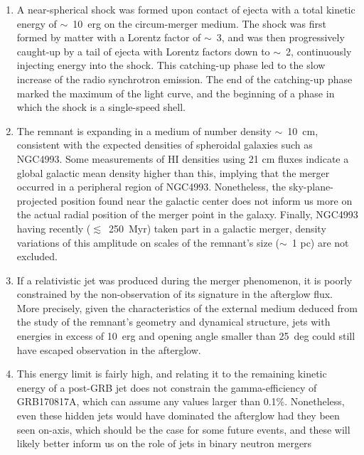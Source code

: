 \begin{enumerate}
    \item A near-spherical shock was formed upon contact of ejecta with a total kinetic energy of $\sim$~10~erg on the circum-merger medium. The shock was first formed by matter with a Lorentz factor of $\sim$~3, and was then progressively caught-up by a tail of ejecta with Lorentz factors down to $\sim$~2, continuously injecting energy into the shock. This catching-up phase led to the slow increase of the radio synchrotron emission. The end of the catching-up phase marked the maximum of the light curve, and the beginning of a phase in which the shock is a single-speed shell.

    \item The remnant is expanding in a medium of number density $\sim$~10~cm, consistent with the expected densities of spheroidal galaxies such as NGC4993. Some measurements of HI densities using 21 cm fluxes indicate a global galactic mean density higher than this, implying that the merger occurred in a peripheral region of NGC4993. Nonetheless, the sky-plane-projected position found near the galactic center does not inform us more on the actual radial position of the merger point in the galaxy. Finally, NGC4993 having recently ($\lesssim$~250~Myr) taken part in a galactic merger, density variations of this amplitude on scales of the remnant's size ($\sim$~1 pc) are not excluded.

    \item If a relativistic jet was produced during the merger phenomenon, it is poorly constrained by the non-observation of its signature in the afterglow flux. More precisely, given the characteristics of the external medium deduced from the study of the remnant's geometry and dynamical structure, jets with energies in excess of 10~erg and opening angle smaller than 25~deg could still have escaped observation in the afterglow.

    \item This energy limit is fairly high, and relating it to the remaining kinetic energy of a post-GRB jet does not constrain the gamma-efficiency of GRB170817A, which can assume any values larger than 0.1\%. Nonetheless, even these hidden jets would have dominated the afterglow had they been seen on-axis, which should be the case for some future events, and these will likely better inform us on the role of jets in binary neutron mergers
\end{enumerate}
